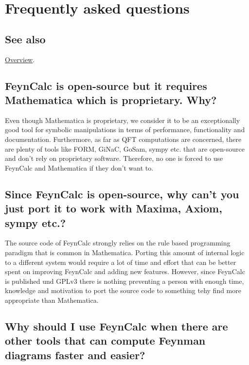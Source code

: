 \documentclass[../FeynCalcManual.tex]{subfiles}
\begin{document}
\hypertarget{frequently asked questions}{
\section{Frequently asked questions}\label{frequently asked questions}}

\subsection{See also}

\hyperlink{toc}{Overview}.

\subsection{FeynCalc is open-source but it requires Mathematica which is
proprietary.
Why?}\label{feyncalc-is-open-source-but-it-requires-mathematica-which-is-proprietary.-why}

Even though Mathematica is proprietary, we consider it to be an
exceptionally good tool for symbolic manipulations in terms of
performance, functionality and documentation. Furthermore, as far as QFT
computations are concerned, there are plenty of tools like FORM, GiNaC,
GoSam, sympy etc. that are open-source and don't rely on proprietary
software. Therefore, no one is forced to use FeynCalc and Mathematica if
they don't want to.

\subsection{Since FeynCalc is open-source, why can't you just port it to
work with Maxima, Axiom, sympy
etc.?}\label{since-feyncalc-is-open-source-why-cant-you-just-port-it-to-work-with-maxima-axiom-sympy-etc.}

The source code of FeynCalc strongly relies on the rule based
programming paradigm that is common in Mathematica. Porting this amount
of internal logic to a different system would require a lot of time and
effort that can be better spent on improving FeynCalc and adding new
features. However, since FeynCalc is published und GPLv3 there is
nothing preventing a person with enough time, knowledge and motivation
to port the source code to something tehy find more appropriate than
Mathematica.

\subsection{Why should I use FeynCalc when there are other tools that
can compute Feynman diagrams faster and
easier?}\label{why-should-i-use-feyncalc-when-there-are-other-tools-that-can-compute-feynman-diagrams-faster-and-easier}
\end{document}
